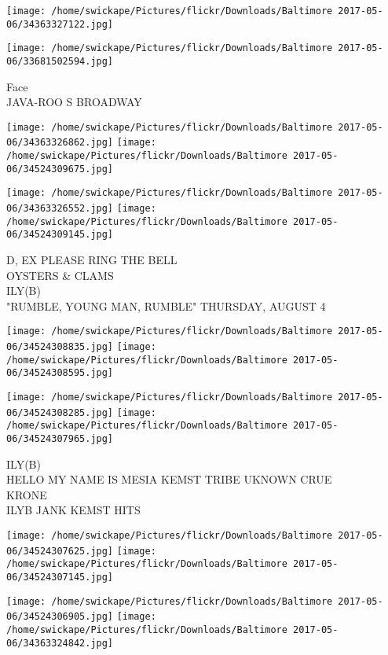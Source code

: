 \documentclass[10pt,letterpaper]{article}
\begin{document}
\texttt{[image: /home/swickape/Pictures/flickr/Downloads/Baltimore 2017-05-06/34363327122.jpg]}

\vspace{0.25in}
\texttt{[image: /home/swickape/Pictures/flickr/Downloads/Baltimore 2017-05-06/33681502594.jpg]}

Face\\
JAVA{-}ROO S BROADWAY
\pagebreak

\texttt{[image: /home/swickape/Pictures/flickr/Downloads/Baltimore 2017-05-06/34363326862.jpg]}
\texttt{[image: /home/swickape/Pictures/flickr/Downloads/Baltimore 2017-05-06/34524309675.jpg]}

\texttt{[image: /home/swickape/Pictures/flickr/Downloads/Baltimore 2017-05-06/34363326552.jpg]}
\texttt{[image: /home/swickape/Pictures/flickr/Downloads/Baltimore 2017-05-06/34524309145.jpg]}

D, EX PLEASE RING THE BELL\\
OYSTERS \& CLAMS\\
ILY(B)\\
"RUMBLE, YOUNG MAN, RUMBLE" THURSDAY, AUGUST 4
\pagebreak

\texttt{[image: /home/swickape/Pictures/flickr/Downloads/Baltimore 2017-05-06/34524308835.jpg]}
\texttt{[image: /home/swickape/Pictures/flickr/Downloads/Baltimore 2017-05-06/34524308595.jpg]}

\texttt{[image: /home/swickape/Pictures/flickr/Downloads/Baltimore 2017-05-06/34524308285.jpg]}
\texttt{[image: /home/swickape/Pictures/flickr/Downloads/Baltimore 2017-05-06/34524307965.jpg]}

ILY(B)\\
HELLO MY NAME IS MESIA KEMST TRIBE UKNOWN CRUE\\
KRONE\\
ILYB JANK KEMST HITS
\pagebreak

\texttt{[image: /home/swickape/Pictures/flickr/Downloads/Baltimore 2017-05-06/34524307625.jpg]}
\texttt{[image: /home/swickape/Pictures/flickr/Downloads/Baltimore 2017-05-06/34524307145.jpg]}

\texttt{[image: /home/swickape/Pictures/flickr/Downloads/Baltimore 2017-05-06/34524306905.jpg]}
\texttt{[image: /home/swickape/Pictures/flickr/Downloads/Baltimore 2017-05-06/34363324842.jpg]}
\end{document}
